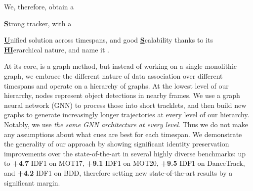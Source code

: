 \documentclass[10pt,twocolumn,letterpaper]{article}
\begin{document}
We, therefore, obtain a {\textbf{\underline{S}}trong tracker, with a {\textbf{\underline{U}}nified solution across timespans, and good \textbf{\underline{S}}calability thanks to its \textbf{\underline{HI}}erarchical nature, and name it \textbf{\modelname}.




At its core, \modelname is a graph method, but instead of working on a single monolithic graph, we embrace the different nature of data association over different timespans and operate on a hierarchy of  graphs. At the lowest level of our hierarchy, nodes represent object detections in nearby frames. We use a graph neural network (GNN) \cite{scarselli_gnn, gilmer2017neural, mpntrack} to process those into short tracklets, and then build new graphs to generate increasingly longer trajectories at every level of our hierarchy. Notably, we use \textit{the same GNN architecture at every level}. Thus we do not make any assumptions about what cues are best for each timespan.
We demonstrate the generality of our approach by showing significant identity preservation improvements over the state-of-the-art in several highly diverse benchmarks: up to \textbf{+4.7} IDF1 on MOT17\cite{motchaijcv}, \textbf{+9.1} IDF1 on MOT20\cite{mot20}, \textbf{+9.5} IDF1 on DanceTrack\cite{dancetrack}, and \textbf{+4.2} IDF1 on BDD\cite{bdd}, therefore setting new state-of-the-art results by a significant margin.  
























































}}
\end{document}
